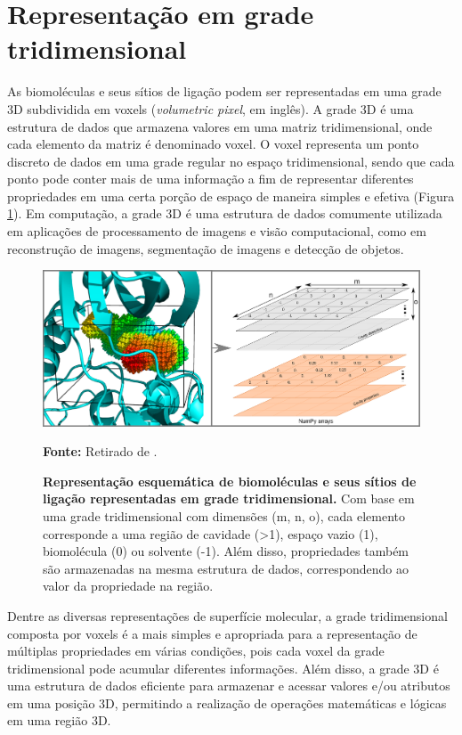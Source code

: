 \documentclass[Portugues]{phdquali}
\begin{document}
\section{Representação em grade tridimensional}

As biomoléculas e seus sítios de ligação podem ser representadas em uma grade 3D subdividida em voxels (\textit{volumetric pixel}, em inglês). A grade 3D é uma estrutura de dados que armazena valores em uma matriz tridimensional, onde cada elemento da matriz é denominado voxel. O voxel representa um ponto discreto de dados em uma grade regular no espaço tridimensional, sendo que cada ponto pode conter mais de uma informação a fim de representar diferentes propriedades em uma certa porção de espaço de maneira simples e efetiva (Figura \ref{fig:voxel}). Em computação, a grade 3D é uma estrutura de dados comumente utilizada em aplicações de processamento de imagens e visão computacional, como em reconstrução de imagens, segmentação de imagens e detecção de objetos. 

\begin{figure}[ht]
  \centerline{\includegraphics[scale=0.75]{images/voxels.png}}
  \centerline{\scriptsize{\textbf{Fonte:} Retirado de \cite{guerra2021}.}}
  \caption[Representação esquemática de biomoléculas e seus sítios de ligação representadas em grade tridimensional]{\textbf{Representação esquemática de biomoléculas e seus sítios de ligação representadas em grade tridimensional.} Com base em uma grade tridimensional com dimensões (m, n, o), cada elemento corresponde a uma região de cavidade (>1), espaço vazio (1), biomolécula (0) ou solvente (-1). Além disso, propriedades também são armazenadas na mesma estrutura de dados, correspondendo ao valor da propriedade na região.}
  \label{fig:voxel}
\end{figure}

Dentre as diversas representações de superfície molecular, a grade tridimensional composta por voxels é a mais simples e apropriada para a representação de múltiplas propriedades em várias condições, pois cada voxel da grade tridimensional pode acumular diferentes informações. Além disso, a grade 3D é uma estrutura de dados eficiente para armazenar e acessar valores e/ou atributos em uma posição 3D, permitindo a realização de operações matemáticas e lógicas em uma região 3D. 
\end{document}
